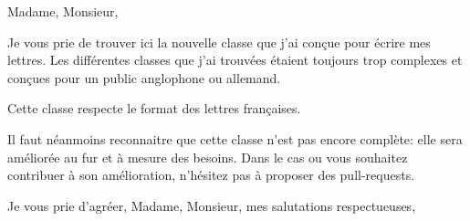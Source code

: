 \documentclass[12pt]{frenchletter}
\date{\today}
\begin{document}
    \opening{Madame, Monsieur,}

    Je vous prie de trouver ici la nouvelle classe que j'ai conçue pour écrire mes lettres. Les différentes classes que j'ai trouvées étaient toujours trop complexes et conçues pour un public anglophone ou allemand.
    
    Cette classe respecte le format des lettres françaises.
    
    Il faut néanmoins reconnaitre que cette classe n'est pas encore complète: elle sera améliorée au fur et à mesure des besoins. Dans le cas ou vous souhaitez contribuer à son amélioration, n'hésitez pas à proposer des pull-requests.
    
    \closing{Je vous prie d'agréer, Madame, Monsieur, mes salutations respectueuses,}
\end{document}
